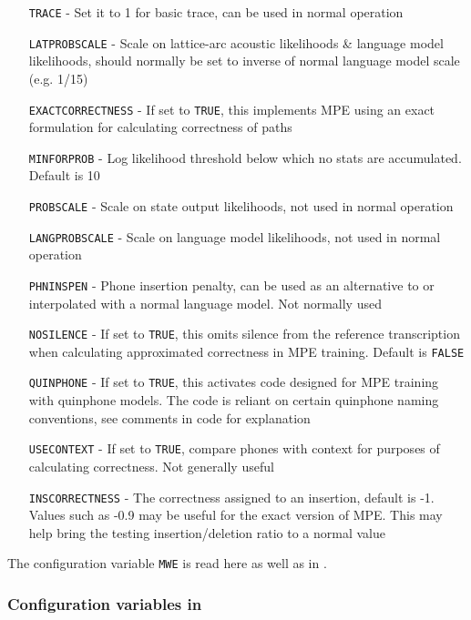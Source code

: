 \begin{itemize}
\item[\texttt{TRACE}] - Set it to 1 for basic trace, can be used in normal operation
\item[\texttt{LATPROBSCALE}] - Scale on lattice-arc acoustic likelihoods \& language model likelihoods, 
  should normally be set to inverse of normal language model scale (e.g. 1/15)
\item[\texttt{EXACTCORRECTNESS}] - If set to {\tt TRUE}, this implements MPE using an exact
  formulation for calculating correctness of paths
\item[\texttt{MINFORPROB}] - Log likelihood threshold below which no stats are accumulated. Default is 10
\item[\texttt{PROBSCALE}] - Scale on state output likelihoods, not used in normal operation
\item[\texttt{LANGPROBSCALE}] - Scale on language model likelihoods, not used in normal operation
\item[\texttt{PHNINSPEN}] - Phone insertion penalty, can be used as an alternative to or 
   interpolated with a normal language model.  Not normally used
\item[\texttt{NOSILENCE}] - If set to {\tt TRUE}, this omits silence from the reference transcription
    when calculating approximated correctness in MPE training.  Default is {\tt FALSE}
\item[\texttt{QUINPHONE}] - If set to {\tt TRUE}, this activates code designed for MPE
  training with quinphone models.  The code is reliant on certain quinphone naming conventions,
  see comments in code for explanation
\item[\texttt{USECONTEXT}] - If set to {\tt TRUE}, compare phones with context for purposes
  of calculating correctness.  Not generally useful
\item[\texttt{INSCORRECTNESS}] - The correctness assigned to an insertion, default is -1.
  Values such as -0.9 may be useful for the exact version of MPE.  This may help
   bring the testing insertion/deletion ratio to a normal value 
\end{itemize}

The configuration variable {\tt MWE} is read here as well as in
. 


\subsubsection{Configuration variables in }

